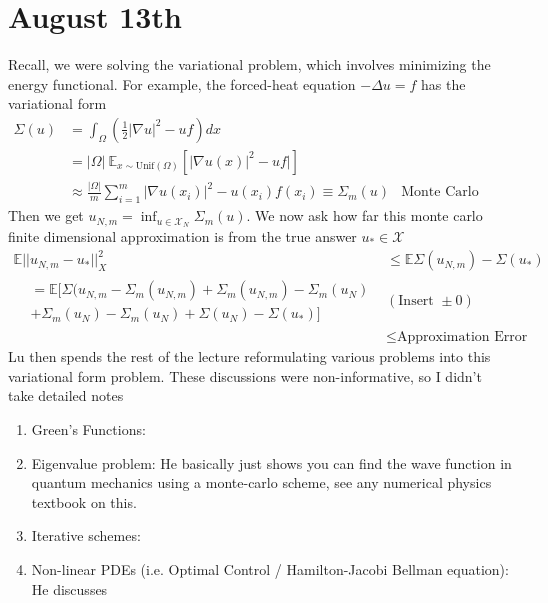 \section{August 13th}
Recall, we were solving the variational problem, which involves minimizing the energy functional. For example, the forced-heat equation $-\Delta u = f$ has the variational form
\begin{align}
	\Sigma(u) & =  \int_\Omega (\frac{1}{2} |\nabla u|^2 - u f)dx\\
	& = |\Omega|~ \mathbb E_{x \sim \text{Unif}(\Omega)} [|\nabla u(x) |^2 - uf|]\\
	& \approx \frac{|\Omega|}{m} \sum_{i=1}^m |\nabla u(x_i)|^2 - u(x_i)f(x_i) \equiv \Sigma_m(u) & \text{Monte Carlo sampling}
\end{align}
Then we get $u_{N,m} = \inf_{u \in \mathcal X_N} \Sigma_m (u)$. We now ask how far this monte carlo finite dimensional approximation is from the true answer $u_* \in \mathcal X$
\begin{align}
	\mathbb E|| u_{N,m} - u_*||^2_{X} & \leq \mathbb E \Sigma(u_{N,m}) - \Sigma(u_*)\\
	  \begin{split}  & = \mathbb E \Big[ \Sigma(u_{N,m} - \Sigma_m(u_{N,m}) + \Sigma_m(u_{N,m})  - \Sigma_m (u_N) \\  & + \Sigma_m(u_N) - \Sigma_m(u_N) + \Sigma(u_N) - \Sigma(u_*) \Big] \end{split} & (\text{Insert } \pm 0) \\
	& \leq \text{Approximation Error}
\end{align}
Lu then spends the rest of the lecture reformulating various problems into this variational form problem. These discussions were non-informative, so I didn't take detailed notes
\begin{enumerate}
	\item Green's Functions:
	\item Eigenvalue problem: He basically just shows you can find the wave function in quantum mechanics using a monte-carlo scheme, see any numerical physics textbook on this.
	\item Iterative schemes:
	\item Non-linear PDEs (i.e. Optimal Control / Hamilton-Jacobi Bellman equation): He discusses 
\end{enumerate}








































